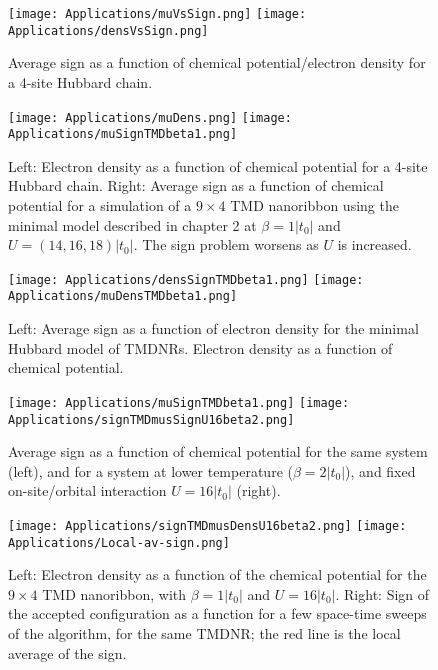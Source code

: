 \begin{figure}[H]
\texttt{[image: Applications/muVsSign.png]}
\texttt{[image: Applications/densVsSign.png]}
	\caption[Average sign as a function of chemical potential/electron density for a 4-site Hubbard chain.]{Average sign as a function of chemical potential/electron density for a 4-site Hubbard chain.}
	\label{fig:signMuDens}
\end{figure}
\begin{figure}[H]
\texttt{[image: Applications/muDens.png]}
\texttt{[image: Applications/muSignTMDbeta1.png]}
	\caption[Electron density as a function of chemical potential for a 4-site Hubbard chain. Average sign as a function of chemical potential for a simulation of a $9 \times 4$ TMD nanoribbon using the minimal model described in chapter 2.]{Left: Electron density as a function of chemical potential for a 4-site Hubbard chain.
	Right: Average sign as a function of chemical potential for a simulation of a $9 \times 4$ TMD nanoribbon using the minimal model described in chapter 2 at $\beta = 1 |t_0|$ and $U = (14, 16, 18)|t_0|$.
	The sign problem worsens as $U$ is increased.}
	\label{fig:muSign}
\end{figure}
\begin{figure}[H]
\texttt{[image: Applications/densSignTMDbeta1.png]}
\texttt{[image: Applications/muDensTMDbeta1.png]}
	\caption[Average sign as a function of electron density for the minimal Hubbard model of \acs{TMDNR}s. Electron density as a function of chemical potential.]{Left: Average sign as a function of electron density for the minimal Hubbard model of \acs{TMDNR}s. Electron density as a function of chemical potential.}
	\label{fig:densSignmuDens}
\end{figure}
\begin{figure}[H]
\texttt{[image: Applications/muSignTMDbeta1.png]}
\texttt{[image: Applications/signTMDmusSignU16beta2.png]}
	\caption[Average sign as a function of chemical potential for the same system, and for a system at lower temperature ($\beta = 2|t_0|$), and fixed on-site/orbital interaction $U = 16|t_0|$.]{Average sign as a function of chemical potential for the same system (left), and for a system at lower temperature ($\beta = 2|t_0|$), and fixed on-site/orbital interaction $U = 16|t_0|$ (right).}
	\label{fig:muDensU16signDens}
\end{figure}
\begin{figure}[H]
\texttt{[image: Applications/signTMDmusDensU16beta2.png]}
\texttt{[image: Applications/Local-av-sign.png]}
	\caption[Electron density as a function of the chemical potential for the $9 \times 4$ \acs{TMD} nanoribbon, with $\beta = 2|t_0|$ and $U = 16|t_0|$. Sign of the accepted configuration as a function for a few space-time sweeps of the algorithm.]{Left: Electron density as a function of the chemical potential for the $9 \times 4$ \acs{TMD} nanoribbon, with $\beta =1 |t_0|$ and $U = 16|t_0|$.
	Right: Sign of the accepted configuration as a function for a few space-time sweeps of the algorithm, for the same \acs{TMDNR}; the red line is the local average of the sign.}
	\label{fig:SignLoc}
\end{figure}

